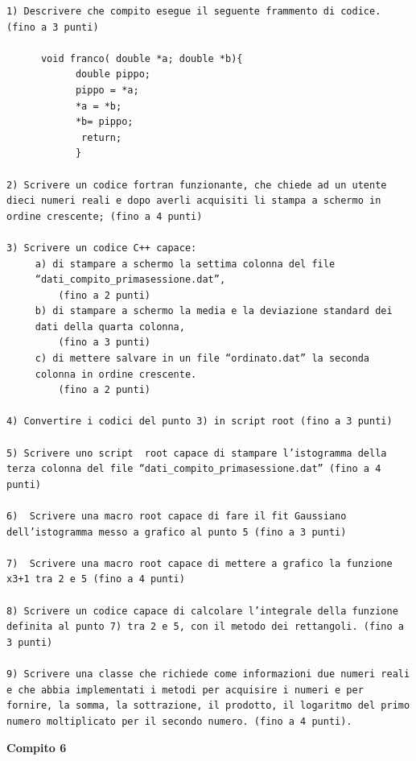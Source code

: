 \documentclass[11pt,fleqn]{book} %
\begin{document}
\begin{verbatim}
1) Descrivere che compito esegue il seguente frammento di codice. (fino a 3 punti)

      void franco( double *a; double *b){
            double pippo;
            pippo = *a;
            *a = *b;
            *b= pippo;
             return;
            }

2) Scrivere un codice fortran funzionante, che chiede ad un utente 
dieci numeri reali e dopo averli acquisiti li stampa a schermo in 
ordine crescente; (fino a 4 punti)

3) Scrivere un codice C++ capace:
     a) di stampare a schermo la settima colonna del file 
     “dati_compito_primasessione.dat”, 
         (fino a 2 punti)
     b) di stampare a schermo la media e la deviazione standard dei 
     dati della quarta colonna,
         (fino a 3 punti)
     c) di mettere salvare in un file “ordinato.dat” la seconda 
     colonna in ordine crescente.
         (fino a 2 punti)

4) Convertire i codici del punto 3) in script root (fino a 3 punti)

5) Scrivere uno script  root capace di stampare l’istogramma della 
terza colonna del file “dati_compito_primasessione.dat” (fino a 4 punti)

6)  Scrivere una macro root capace di fare il fit Gaussiano 
dell’istogramma messo a grafico al punto 5 (fino a 3 punti)

7)  Scrivere una macro root capace di mettere a grafico la funzione 
x3+1 tra 2 e 5 (fino a 4 punti)

8) Scrivere un codice capace di calcolare l’integrale della funzione 
definita al punto 7) tra 2 e 5, con il metodo dei rettangoli. (fino a 3 punti)

9) Scrivere una classe che richiede come informazioni due numeri reali 
e che abbia implementati i metodi per acquisire i numeri e per 
fornire, la somma, la sottrazione, il prodotto, il logaritmo del primo 
numero moltiplicato per il secondo numero. (fino a 4 punti).
\end{verbatim}

\textbf{Compito 6}
\end{document}

